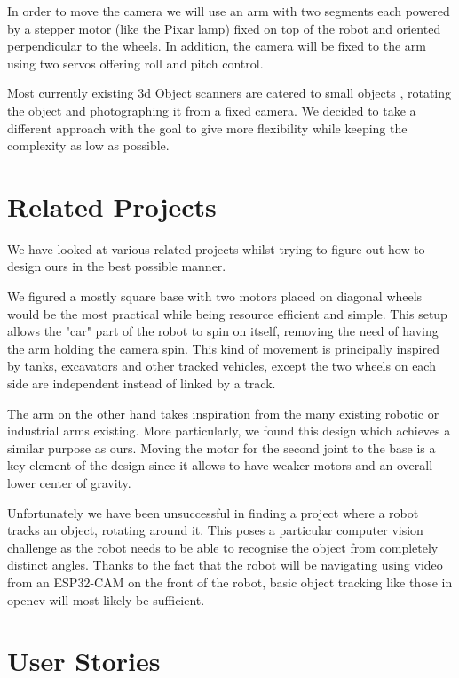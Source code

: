 \documentclass{article}
\begin{document}
In order to move the camera we will use an arm with two segments each powered by a stepper motor (like the Pixar lamp) fixed on top of the robot and oriented perpendicular to the wheels. In addition, the camera will be fixed to the arm using two servos offering roll and pitch control.


Most currently existing 3d Object scanners are catered to small objects \cite{desktop3dscanner}, rotating the object and photographing it from a fixed camera. We decided to take a different approach with the goal to give more flexibility while keeping the complexity as low as possible.


\newpage
\section{Related Projects}
We have looked at various related projects whilst trying to figure out how to design ours in the best possible manner.

We figured a mostly square base with two motors placed on diagonal wheels would be the most practical while being resource efficient and simple. This setup allows the "car" part of the robot to spin on itself, removing the need of having the arm holding the camera spin. This kind of movement is principally inspired by tanks, excavators and other tracked vehicles, except the two wheels on each side are independent instead of linked by a track.

The arm on the other hand takes inspiration from the many existing robotic or industrial arms existing. More particularly, we found this design \cite{cameraArm} which achieves a similar purpose as ours. Moving the motor for the second joint to the base is a key element of the design since it allows to have weaker motors and an overall lower center of gravity.

Unfortunately we have been unsuccessful in finding a project where a robot tracks an object, rotating around it. This poses a particular computer vision challenge as the robot needs to be able to recognise the object from completely distinct angles. Thanks to the fact that the robot will be navigating using video from an ESP32-CAM on the front of the robot, basic object tracking like those in opencv will most likely be sufficient.




\section{User Stories}
\end{document}
